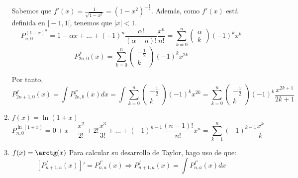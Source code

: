 \begin{ejercicio}
\begin{enumerate}
        Sabemos que $f'(x) = \frac{1}{\sqrt{1-x^2}} = (1-x^2)^{-\frac{1}{2}}$. Además, como $f'(x)$ está definida en $]-1,1[$, tenemos que $|x|<1$.
        \begin{equation*}
            P_{n, 0}^{(1-x)^\alpha} = 1 - \alpha x + \dots + (-1)^n\frac{\alpha!}{(\alpha-n)!} \frac{x^n}{n!} = \sum_{k=0}^n \left(\begin{array}{c}
                \alpha \\ k \end{array} \right) (-1)^k x^k
        \end{equation*}
        \begin{equation*}
            P_{2n,0}^{f'}(x) =
            \sum_{k=0}^n \left(\begin{array}{c}
                -\frac{1}{2} \\ k \end{array} \right) (-1)^k x^{2k}
        \end{equation*}

        Por tanto,
        \begin{equation*}
            P_{2n+1, 0}^f (x) = \int P_{2n,0}^{f'}(x) dx = \int \sum_{k=0}^n \left(\begin{array}{c}
            -\frac{1}{2} \\ k \end{array} \right) (-1)^k x^{2k}
            = \sum_{k=0}^n \left(\begin{array}{c}
            -\frac{1}{2} \\ k \end{array} \right) (-1)^k \frac{x^{2k+1}}{2k+1}
        \end{equation*}

        \item $f(x) = \ln(1+x)$
        \begin{equation*}
            P_{n, 0}^{\ln(1+x)} = 0 + x -\frac{x^2}{2!} + 2! \frac{x^3}{3!} + \dots + (-1)^{n-1} \frac{(n-1)!}{n!}x^n
            = \sum_{k=1}^n (-1)^{k-1} \frac{x^k}{k}
        \end{equation*}

        \item $f(x) = \arctg(x)$
        Para calcular su desarrollo de Taylor, hago uso de que:
        \begin{equation*}
            \left[ P_{n+1, a}^f (x) \right]' =P_{n,a}^{f'} (x)\Longrightarrow P_{n+1, a}^f (x) = \int P_{n,a}^{f'}(x) dx
        \end{equation*}


\end{enumerate}
\end{ejercicio}
